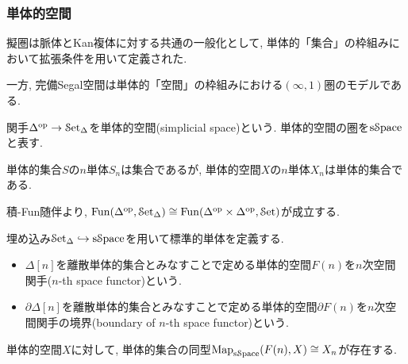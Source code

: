 \documentclass[aspectratio=169, dvipdfmx, 8pt, notheorems, uplatex]{beamer}
\begin{document}
\begin{frame}
  \frametitle{単体的空間}

  擬圏は脈体とKan複体に対する共通の一般化として, 単体的「集合」の枠組みにおいて拡張条件を用いて定義された. 

  一方, 完備Segal空間は単体的「空間」の枠組みにおける$(\infty,1)$圏のモデルである. 

  \begin{definition}[単体的空間]
    関手$\Delta^{\mathrm{op}} \to \mathcal{S}\mathrm{et}_{\Delta}$を単体的空間(simplicial space)という. 
    単体的空間の圏を$\mathrm{s}\mathcal{S}\mathrm{pace}$と表す. 
  \end{definition}

  単体的集合$S$の$n$単体$S_n$は集合であるが, 単体的空間$X$の$n$単体$X_n$は単体的集合である. 

  \begin{remark}
    積-Fun随伴より, $\mathrm{Fun}(\Delta^{\mathrm{op}}, \mathcal{S}\mathrm{et}_{\Delta}) \cong \mathrm{Fun}(\Delta^{\mathrm{op}} \times \Delta^{\mathrm{op}}, \mathcal{S}\mathrm{et})$が成立する. 
  \end{remark}

  埋め込み$\mathcal{S}\mathrm{et}_{\Delta} \hookrightarrow \mathrm{s}\mathcal{S}\mathrm{pace}$を用いて標準的単体を定義する. 

  \begin{definition}
    \begin{itemize}
      \item $\Delta[n]$を離散単体的集合とみなすことで定める単体的空間$F(n)$を$n$次空間関手($n$-th space functor)という. 
      \item $\partial \Delta[n]$を離散単体的集合とみなすことで定める単体的空間$\partial F(n)$を$n$次空間関手の境界(boundary of $n$-th space functor)という. 
    \end{itemize}
  \end{definition}

  \begin{remark}
    単体的空間$X$に対して, 単体的集合の同型$\mathrm{Map}_{\mathrm{s}\mathcal{S}\mathrm{pace}}(F(n),X) \cong X_n$が存在する. 
  \end{remark}

\end{frame}
\end{document}
